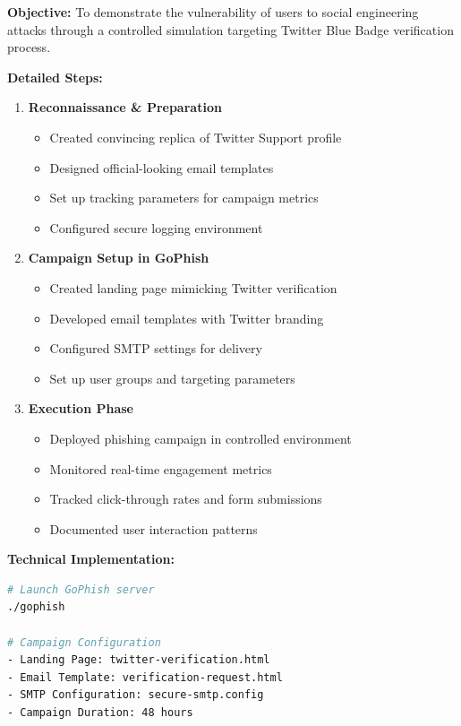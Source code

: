 \documentclass[12pt]{article}
\begin{document}
\textbf{Objective:}
To demonstrate the vulnerability of users to social engineering attacks through a controlled simulation targeting Twitter Blue Badge verification process.

\textbf{Detailed Steps:}
\begin{enumerate}
    \item \textbf{Reconnaissance \& Preparation}
    \begin{itemize}
        \item Created convincing replica of Twitter Support profile
        \item Designed official-looking email templates
        \item Set up tracking parameters for campaign metrics
        \item Configured secure logging environment
    \end{itemize}

    \item \textbf{Campaign Setup in GoPhish}
    \begin{itemize}
        \item Created landing page mimicking Twitter verification
        \item Developed email templates with Twitter branding
        \item Configured SMTP settings for delivery
        \item Set up user groups and targeting parameters
    \end{itemize}

    \item \textbf{Execution Phase}
    \begin{itemize}
        \item Deployed phishing campaign in controlled environment
        \item Monitored real-time engagement metrics
        \item Tracked click-through rates and form submissions
        \item Documented user interaction patterns
    \end{itemize}
\end{enumerate}

\textbf{Technical Implementation:}
\begin{lstlisting}[language=bash]
# Launch GoPhish server
./gophish

# Campaign Configuration
- Landing Page: twitter-verification.html
- Email Template: verification-request.html
- SMTP Configuration: secure-smtp.config
- Campaign Duration: 48 hours
\end{lstlisting}
\end{document}
